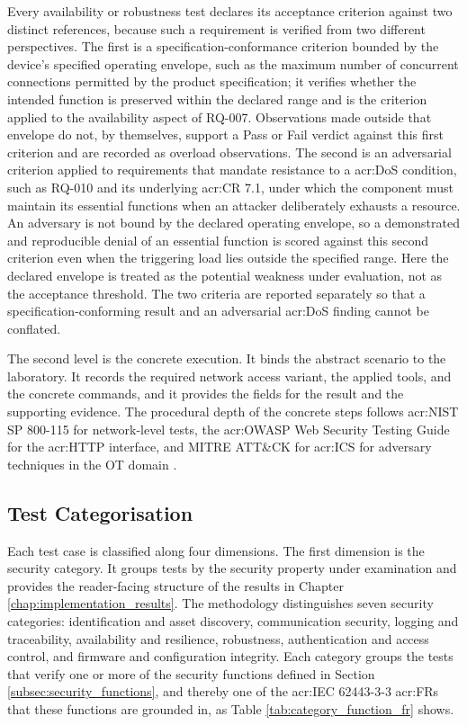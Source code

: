 Every availability or robustness test declares its acceptance criterion against two distinct references, because such a requirement is verified from two different perspectives. The first is a specification-conformance criterion bounded by the device's specified operating envelope, such as the maximum number of concurrent connections permitted by the product specification; it verifies whether the intended function is preserved within the declared range and is the criterion applied to the availability aspect of RQ-007. Observations made outside that envelope do not, by themselves, support a Pass or Fail verdict against this first criterion and are recorded as overload observations. The second is an adversarial criterion applied to requirements that mandate resistance to a \gls{acr:DoS} condition, such as RQ-010 and its underlying \gls{acr:CR} 7.1, under which the component must maintain its essential functions when an attacker deliberately exhausts a resource. An adversary is not bound by the declared operating envelope, so a demonstrated and reproducible denial of an essential function is scored against this second criterion even when the triggering load lies outside the specified range. Here the declared envelope is treated as the potential weakness under evaluation, not as the acceptance threshold. The two criteria are reported separately so that a specification-conforming result and an adversarial \gls{acr:DoS} finding cannot be conflated. 

The second level is the concrete execution. It binds the abstract scenario to the laboratory. It records the required network access variant, the applied tools, and the concrete commands, and it provides the fields for the result and the supporting evidence. The procedural depth of the concrete steps follows \gls{acr:NIST} SP 800-115 for network-level tests, the \gls{acr:OWASP} Web Security Testing Guide for the \gls{acr:HTTP} interface, and MITRE ATT\&CK for \gls{acr:ICS} for adversary techniques in the OT domain \cite[p. 1-1]{nist_sp800_115} \cite{manana2026pentest} \cite{mitre_attack_ics}. 

\subsection{Test Categorisation} 
\label{subsec:test_categorisation} 

Each test case is classified along four dimensions. The first dimension is the security category. It groups tests by the security property under examination and provides the reader-facing structure of the results in Chapter \ref{chap:implementation_results}. The methodology distinguishes seven security categories: identification and asset discovery, communication security, logging and traceability, availability and resilience, robustness, authentication and access control, and firmware and configuration integrity. Each category groups the tests that verify one or more of the security functions defined in Section \ref{subsec:security_functions}, and thereby one of the \gls{acr:IEC} 62443-3-3 \glspl{acr:FR} that these functions are grounded in, as Table \ref{tab:category_function_fr} shows. 

